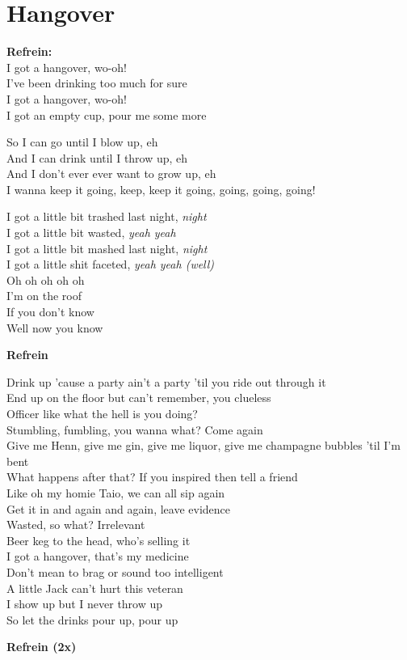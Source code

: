 \section{Hangover}
\textbf{Refrein:}\\
I got a hangover, wo-oh!\\
I've been drinking too much for sure\\
I got a hangover, wo-oh!\\
I got an empty cup, pour me some more

So I can go until I blow up, eh\\
And I can drink until I throw up, eh\\
And I don't ever ever want to grow up, eh\\
I wanna keep it going, keep, keep it going, going, going, going!

I got a little bit trashed last night, \textit{night}\\
I got a little bit wasted, \textit{yeah yeah}\\
I got a little bit mashed last night, \textit{night}\\
I got a little shit faceted, \textit{yeah yeah (well)}\\
Oh oh oh oh oh\\
I'm on the roof\\
If you don't know\\
Well now you know

\textbf{Refrein}

Drink up 'cause a party ain't a party 'til you ride out through it\\
End up on the floor but can't remember, you clueless\\
Officer like what the hell is you doing?\\
Stumbling, fumbling, you wanna what? Come again\\
Give me Henn, give me gin, give me liquor, give me champagne bubbles 'til I'm bent\\
What happens after that? If you inspired then tell a friend\\
Like oh my homie Taio, we can all sip again\\
Get it in and again and again, leave evidence\\
Wasted, so what? Irrelevant\\
Beer keg to the head, who's selling it\\
I got a hangover, that's my medicine\\
Don't mean to brag or sound too intelligent\\
A little Jack can't hurt this veteran\\
I show up but I never throw up\\
So let the drinks pour up, pour up

\textbf{Refrein (2x)}